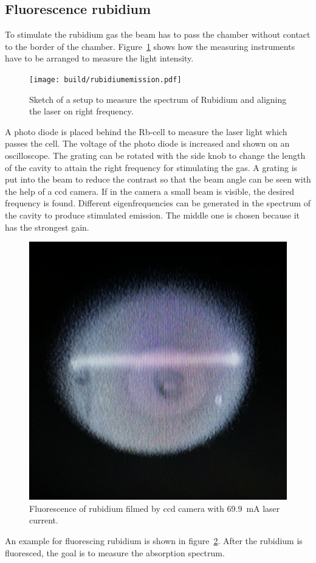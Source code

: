 \subsection{Fluorescence rubidium}%
\label{sub:anregen_rubidium}

To stimulate the rubidium gas the beam has to pass the chamber without contact
to the border of the chamber.
Figure~\ref{fig:hole_emission} shows how the measuring instruments have to be
arranged to measure the light intensity.
\begin{figure}[h]
		\centering
		\texttt{[image: build/rubidiumemission.pdf]}
		\caption{Sketch of a setup to measure the spectrum of Rubidium and
		aligning the laser on right frequency.\cite{anleitung}}%
		\label{fig:hole_emission}
\end{figure}
A photo diode is placed behind the Rb-cell to measure the laser light which
passes the cell.
The voltage of the photo diode is increased and shown on an oscilloscope.
The grating can be rotated with the side knob to change the length of the
cavity to attain the right frequency for stimulating the gas.
A grating is put into the beam to reduce the contrast so that the beam angle
can be seen with the help of a ccd camera.
If in the camera a small beam is visible, the desired frequency is found.
Different eigenfrequencies can be generated in the spectrum of the
cavity to produce stimulated emission.
The middle one is chosen because it has the strongest gain.
\begin{figure}[h]
		\centering
		\includegraphics[width=0.4\linewidth]{./content/pictures/fluorescence.jpg}
		\caption{Fluorescence of rubidium filmed by ccd camera with
				\SI{69.9}{\milli\ampere} laser current.}%
		\label{fig:ionized}
\end{figure}
An example for fluorescing rubidium is shown in figure~\ref{fig:ionized}.
After the rubidium is fluoresced, the goal is to measure the absorption spectrum.

